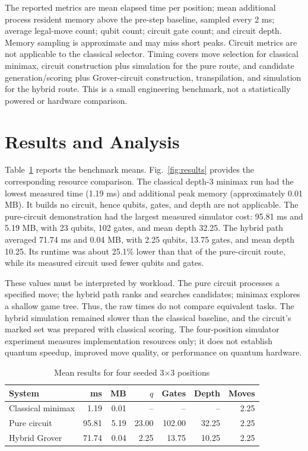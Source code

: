 \documentclass[conference]{IEEEtran}
\begin{document}
The reported metrics are mean elapsed time per position; mean additional process resident memory above the pre-step baseline, sampled every 2 ms; average legal-move count; qubit count; circuit gate count; and circuit depth. Memory sampling is approximate and may miss short peaks. Circuit metrics are not applicable to the classical selector. Timing covers move selection for classical minimax, circuit construction plus simulation for the pure route, and candidate generation/scoring plus Grover-circuit construction, transpilation, and simulation for the hybrid route. This is a small engineering benchmark, not a statistically powered or hardware comparison.

\section{Results and Analysis}
Table~\ref{tab:results} reports the benchmark means. Fig.~\ref{fig:results} provides the corresponding resource comparison. The classical depth-3 minimax run had the lowest measured time (1.19 ms) and additional peak memory (approximately 0.01 MB). It builds no circuit, hence qubits, gates, and depth are not applicable. The pure-circuit demonstration had the largest measured simulator cost: 95.81 ms and 5.19 MB, with 23 qubits, 102 gates, and mean depth 32.25. The hybrid path averaged 71.74 ms and 0.04 MB, with 2.25 qubits, 13.75 gates, and mean depth 10.25. Its runtime was about 25.1\% lower than that of the pure-circuit route, while its measured circuit used fewer qubits and gates.

These values must be interpreted by workload. The pure circuit processes a specified move; the hybrid path ranks and searches candidates; minimax explores a shallow game tree. Thus, the raw times do not compare equivalent tasks. The hybrid simulation remained slower than the classical baseline, and the circuit's marked set was prepared with classical scoring. The four-position simulator experiment measures implementation resources only; it does not establish quantum speedup, improved move quality, or performance on quantum hardware.

\begin{table}[t]
\caption{Mean results for four seeded 3$\times$3 positions}
\label{tab:results}
\centering
\footnotesize
\setlength{\tabcolsep}{3pt}
\begin{tabular}{lrrrrrr}
\toprule
System & ms & MB & $q$ & Gates & Depth & Moves\\
\midrule
Classical minimax & 1.19 & 0.01 & -- & -- & -- & 2.25\\
Pure circuit & 95.81 & 5.19 & 23.00 & 102.00 & 32.25 & 2.25\\
Hybrid Grover & 71.74 & 0.04 & 2.25 & 13.75 & 10.25 & 2.25\\
\bottomrule
\end{tabular}
\end{table}
\end{document}
